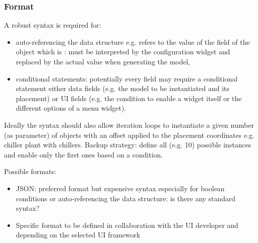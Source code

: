 \documentclass[letterpaper,10pt, openany,english]{sphinxmanual}
\begin{document}
\subsubsection{Format}
\label{\detokenize{requirements:format}}
A robust syntax is required for:
\begin{itemize}
\item {} 
auto-referencing the data structure e.g.  refers to the value of the field  of the object which  is : must be interpreted by the configuration widget and replaced by the actual value when generating the model,

\item {} 
conditional statements: potentially every field may require a conditional statement \textendash{} either data fields (e.g. the model to be instantiated and its placement) or UI fields (e.g. the condition to enable a widget itself or the different options of a menu widget).

\end{itemize}

Ideally the syntax should also allow iteration  loops to instantiate a given number (as parameter) of objects with an offset applied to the placement coordinates e.g. chiller plant with  chillers. Backup strategy: define all (e.g. 10) possible instances and enable only the first  ones based on a condition.

Possible formats:
\begin{itemize}
\item {} 
JSON: preferred format but expensive syntax especially for boolean conditions or auto-referencing the data structure: is there any standard syntax?

\item {} 
Specific format to be defined in collaboration with the UI developer and depending on the selected UI framework

\end{itemize}
\end{document}
